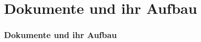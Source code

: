 \section{Dokumente und ihr Aufbau}

\begin{frame}
  \frametitle{Dokumente und ihr Aufbau}
  
\end{frame}
